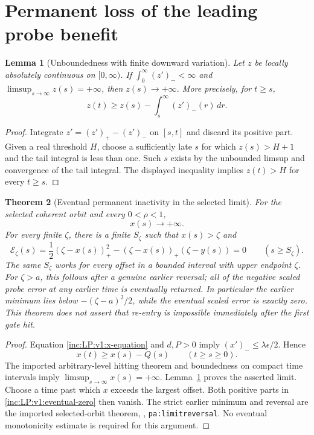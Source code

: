 \documentclass[11pt]{article}
\numberwithin{equation}{section}
\newtheorem{theorem}{Theorem}[section]
\newtheorem{lemma}[theorem]{Lemma}
\theoremstyle{remark}\newtheorem{remark}[theorem]{Remark}
\newcommand{\dd}{\,d}
\begin{document}
\section{Permanent loss of the leading probe benefit}
\label{inc:LP:v1:persistence}
\begin{lemma}[Unboundedness with finite downward variation]
\label{inc:LP:v1:downward}
Let $z$ be locally absolutely continuous on $[0,\infty)$. If
$\int_0^\infty(z')_-<\infty$ and $\limsup_{s\to\infty}z(s)=+\infty$,
then $z(s)\to+\infty$. More precisely, for $t\ge s$,
\[
 z(t)\ge z(s)-\int_s^\infty(z')_-(r)\dd r.
\]
\end{lemma}
\begin{proof}
Integrate $z'= (z')_+-(z')_-$ on $[s,t]$ and discard its positive part.
Given a real threshold $H$, choose a sufficiently late $s$ for which
$z(s)>H+1$ and the tail integral is less than one. Such $s$ exists by the
unbounded limsup and convergence of the tail integral. The displayed
inequality implies $z(t)>H$ for every $t\ge s$.
\end{proof}

\begin{theorem}[Eventual permanent inactivity in the selected limit]
\label{inc:LP:v1:permanence}
For the selected coherent orbit and every $0<\rho<1$,
\[
 x(s)\longrightarrow+\infty.
\]
For every finite $\zeta$, there is a finite $S_\zeta$ such that
$x(s)>\zeta$ and
\begin{equation}\label{inc:LP:v1:eventual-zero}
 \mathcal E_\zeta(s)
 =\frac12(\zeta-x(s))_+^2
 -(\zeta-x(s))_+(\zeta-y(s))=0
 \qquad(s\ge S_\zeta).
\end{equation}
The same $S_\zeta$ works for every offset in a bounded interval with upper
endpoint $\zeta$. For $\zeta>a$, this follows after a genuine earlier
reversal; all of the negative scaled probe error at any earlier time is
eventually returned. In particular the earlier minimum lies below
$-(\zeta-a)^2/2$, while the eventual scaled error is exactly zero.
This theorem does not assert that re-entry is impossible immediately after
the first gate hit.
\end{theorem}
\begin{proof}
Equation \eqref{inc:LP:v1:x-equation} and $d,P>0$ imply
$(x')_-\le\lambda\epsilon/2$. Hence
\[
 x(t)\ge x(s)-Q(s)\qquad(t\ge s\ge0).
\]
The imported arbitrary-level hitting theorem and boundedness on compact
time intervals imply $\limsup_{s\to\infty}x(s)=+\infty$.
Lemma~\ref{inc:LP:v1:downward} proves the asserted limit. Choose a time
past which $x$ exceeds the largest offset. Both positive parts in
\eqref{inc:LP:v1:eventual-zero} then vanish. The strict earlier minimum
and reversal are the imported selected-orbit theorem, \cite{P},
\texttt{pa:limitreversal}. No eventual monotonicity estimate is required for
this argument.
\end{proof}
\end{document}

